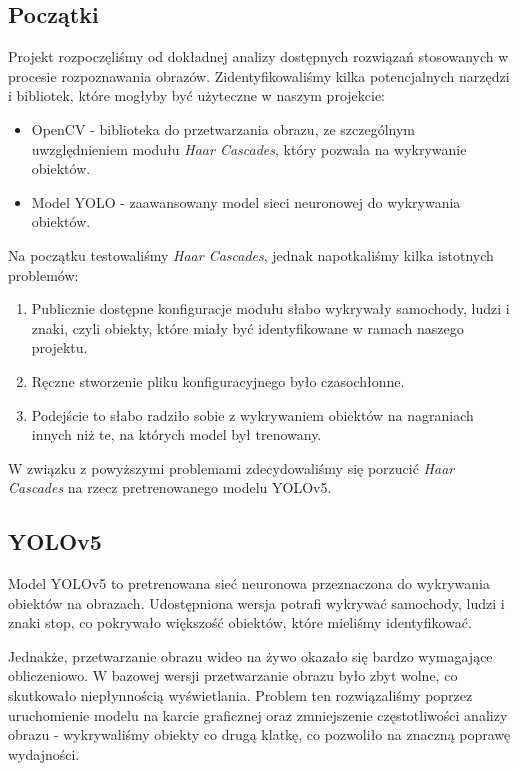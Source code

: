 \subsection*{Początki}

Projekt rozpoczęliśmy od dokładnej analizy dostępnych rozwiązań stosowanych w procesie rozpoznawania obrazów. Zidentyfikowaliśmy kilka potencjalnych narzędzi i bibliotek, które mogłyby być użyteczne w naszym projekcie:
\begin{itemize}
    \item OpenCV - biblioteka do przetwarzania obrazu, ze szczególnym uwzględnieniem modułu \textit{Haar Cascades}, który pozwala na wykrywanie obiektów.
    \item Model YOLO - zaawansowany model sieci neuronowej do wykrywania obiektów.
\end{itemize}

Na początku testowaliśmy \textit{Haar Cascades}, jednak napotkaliśmy kilka istotnych problemów:
\begin{enumerate}
    \item Publicznie dostępne konfiguracje modułu słabo wykrywały samochody, ludzi i znaki, czyli obiekty, które miały być identyfikowane w ramach naszego projektu.
    \item Ręczne stworzenie pliku konfiguracyjnego było czasochłonne.
    \item Podejście to słabo radziło sobie z wykrywaniem obiektów na nagraniach innych niż te, na których model był trenowany.
\end{enumerate}

W związku z powyższymi problemami zdecydowaliśmy się porzucić \textit{Haar Cascades} na rzecz pretrenowanego
modelu YOLOv5.

\subsection*{YOLOv5}

Model YOLOv5 \citep[zobacz:][]{YOLOv5} to pretrenowana sieć neuronowa przeznaczona do wykrywania obiektów na obrazach. Udostępniona wersja potrafi wykrywać samochody, ludzi i znaki stop, co pokrywało większość obiektów, które mieliśmy identyfikować.

Jednakże, przetwarzanie obrazu wideo na żywo okazało się bardzo wymagające obliczeniowo. W bazowej wersji przetwarzanie obrazu było zbyt wolne, co skutkowało niepłynnością wyświetlania. Problem ten rozwiązaliśmy poprzez uruchomienie modelu na karcie graficznej oraz zmniejszenie częstotliwości analizy obrazu - wykrywaliśmy obiekty co drugą klatkę, co pozwoliło na znaczną poprawę wydajności.

